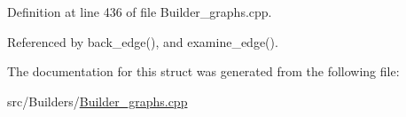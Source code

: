 Definition at line 436 of file Builder\_\-graphs.cpp.



Referenced by back\_\-edge(), and examine\_\-edge().



The documentation for this struct was generated from the following file:\begin{DoxyCompactItemize}
\item 
src/Builders/\hyperlink{Builder__graphs_8cpp}{Builder\_\-graphs.cpp}\end{DoxyCompactItemize}
